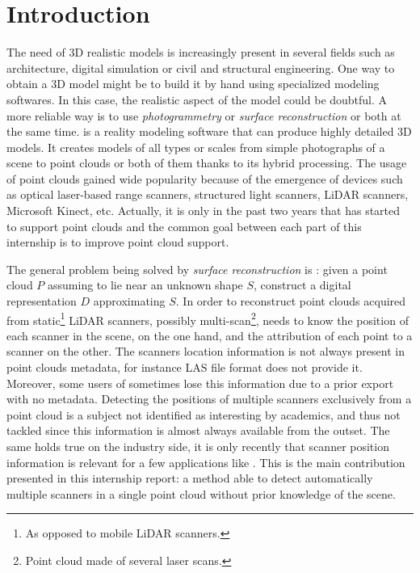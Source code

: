 \chapter{Introduction}
\label{ch:introduction}

The need of 3D realistic models is increasingly present in several fields such as architecture, digital simulation or civil and structural engineering. One way to obtain a 3D model might be to build it by hand using specialized modeling softwares. In this case, the realistic aspect of the model could be doubtful. A more reliable way is to use \emph{photogrammetry} or \emph{surface reconstruction} or both at the same time. \CC is a reality modeling software that can produce highly detailed 3D  models. It creates models of all types or scales from simple photographs of a scene to point clouds or both of them thanks to its hybrid processing. The usage of point clouds gained wide popularity because of the emergence of devices such as optical laser-based range scanners, structured light scanners, LiDAR scanners, Microsoft Kinect, etc. Actually, it is only in the past two years that \CC has started to support point clouds and the common goal between each part of this internship is to improve \CC point cloud support.

The general problem being solved by \emph{surface reconstruction} is :  given a point cloud $P$ assuming to lie near an unknown shape $S$,  construct a digital representation $D$ approximating $S$. In order to reconstruct point clouds acquired from static\footnote{As opposed to mobile LiDAR scanners.} LiDAR scanners, possibly multi-scan\footnote{Point cloud made of several laser scans.}, \CC needs to know the position of each scanner in the scene, on the one hand, and the attribution of each
point to a scanner on the other. The scanners location information is not always present in point clouds metadata, for instance LAS file format does not provide it. Moreover, some users of \CC sometimes lose this information due to a prior export with no metadata. Detecting the positions of multiple scanners exclusively from a point cloud is a subject not identified as interesting by academics, and thus not tackled since this information is almost always available from the outset. The same holds true on the industry side, it is only recently that scanner position information is relevant for a few applications like \CC. This is the main contribution presented in this internship report: a method able to detect automatically multiple scanners in a single point cloud without prior knowledge of the scene.

